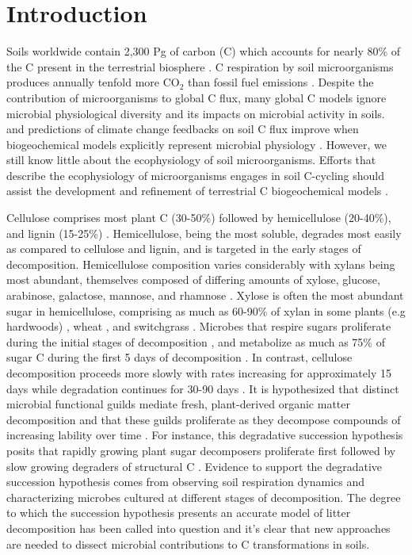 \section{Introduction}
Soils worldwide contain 2,300 Pg of carbon (C) which accounts for nearly 80\%
of the C present in the terrestrial biosphere
\citep{Amundson_2001,BATJES_1996}. C respiration by soil microorganisms
produces annually tenfold more CO$_{2}$ than fossil fuel emissions
\citep{chapin2002principles}. Despite the contribution of microorganisms to
global C flux, many global C models ignore microbial
physiological diversity and its impacts on microbial activity in soils.
\citep{Allison2010,Six2006,Treseder2011} and predictions of climate change
feedbacks on soil C flux improve when biogeochemical models explicitly
represent microbial physiology \citep{Wieder2013}. However, we still know
little about the ecophysiology of soil microorganisms. Efforts that describe
the ecophysiology of microorganisms engages in soil C-cycling 
should assist the development and refinement of terrestrial
C biogeochemical models \citep{Bradford2008,Neff_2001,McGuire2010}.

Cellulose comprises most plant C (30-50\%) followed by hemicellulose (20-40\%),
and lignin (15-25\%) \citep{Lynd2002}. Hemicellulose, being the most soluble,
degrades most easily as compared to cellulose and lignin, and is targeted in
the early stages of decomposition. Hemicellulose composition varies
considerably with xylans being most abundant, themselves
composed of differing amounts of xylose, glucose, arabinose, galactose,
mannose, and rhamnose \citep{Saha2003}. Xylose is often the most abundant sugar
in hemicellulose, comprising as much as 60-90\% of xylan in some plants (e.g
hardwoods) \citep{Spiridon2008}, wheat \citep{Sun2005}, and switchgrass
\citep{Bunnell2013}. Microbes that respire sugars proliferate during the
initial stages of decomposition \citep{Garrett1951,Alexander1964}, and
metabolize as much as 75\% of sugar C during the first 5 days of decomposition
\citep{Engelking2007}. In contrast, cellulose decomposition proceeds more
slowly with rates increasing for approximately 15 days while 
degradation continues for 30-90 days \citep{Hu1997,Engelking2007}. It is
hypothesized that distinct microbial functional guilds mediate fresh,
plant-derived organic matter decomposition and that these guilds proliferate as
they decompose compounds of increasing lability over time
\citep{Hu1997,Rui2009,AnneliseHKjoller2002,Bastian2009}. For instance, this
degradative succession hypothesis posits that rapidly growing plant sugar
decomposers proliferate first \citep{Garrett1963,Bremer1994} followed by slow
growing degraders of structural C \citep{Garrett1963}. Evidence to support the
degradative succession hypothesis comes from observing soil respiration
dynamics and characterizing microbes cultured at different stages of
decomposition. The degree to which the succession hypothesis presents an
accurate model of litter decomposition has been called into question
\citep{AnneliseHKjoller2002,Frankland1998,Osono_2005} and it's clear that new
approaches are needed to dissect microbial contributions to C transformations
in soils.

